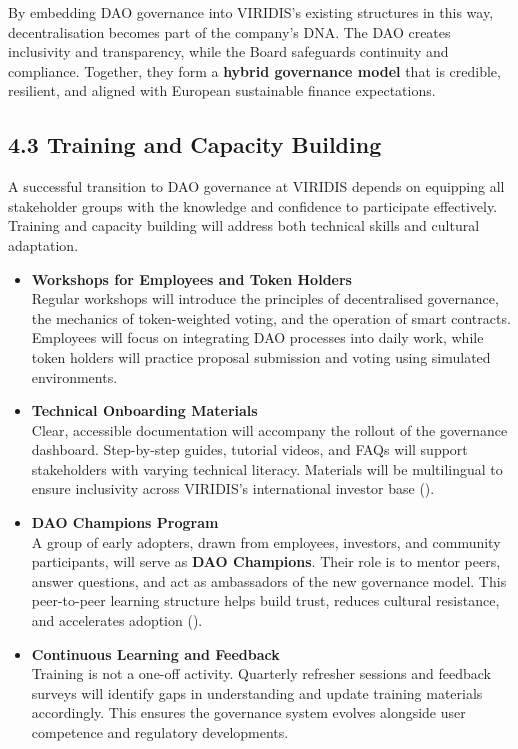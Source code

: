 \documentclass[
  english,
  12pt,
  oneside,
  open=any]{scrbook}
\begin{document}
By embedding DAO governance into VIRIDIS's existing structures in this
way, decentralisation becomes part of the company's DNA. The DAO creates
inclusivity and transparency, while the Board safeguards continuity and
compliance. Together, they form a \textbf{hybrid governance model} that
is credible, resilient, and aligned with European sustainable finance
expectations.

\subsection{4.3 Training and Capacity Building}\label{sec-training}

A successful transition to DAO governance at VIRIDIS depends on
equipping all stakeholder groups with the knowledge and confidence to
participate effectively. Training and capacity building will address
both technical skills and cultural adaptation.

\begin{itemize}
\item
  \textbf{Workshops for Employees and Token Holders}\\
  Regular workshops will introduce the principles of decentralised
  governance, the mechanics of token-weighted voting, and the operation
  of smart contracts. Employees will focus on integrating DAO processes
  into daily work, while token holders will practice proposal submission
  and voting using simulated environments.
\item
  \textbf{Technical Onboarding Materials}\\
  Clear, accessible documentation will accompany the rollout of the
  governance dashboard. Step-by-step guides, tutorial videos, and FAQs
  will support stakeholders with varying technical literacy. Materials
  will be multilingual to ensure inclusivity across VIRIDIS's
  international investor base
  ().
\item
  \textbf{DAO Champions Program}\\
  A group of early adopters, drawn from employees, investors, and
  community participants, will serve as \textbf{DAO Champions}. Their
  role is to mentor peers, answer questions, and act as ambassadors of
  the new governance model. This peer-to-peer learning structure helps
  build trust, reduces cultural resistance, and accelerates adoption
  ().
\item
  \textbf{Continuous Learning and Feedback}\\
  Training is not a one-off activity. Quarterly refresher sessions and
  feedback surveys will identify gaps in understanding and update
  training materials accordingly. This ensures the governance system
  evolves alongside user competence and regulatory developments.
\end{itemize}
\end{document}
